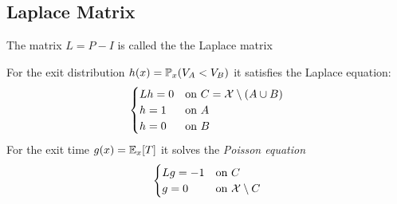 \documentclass[12pt,a4paper]{article}
\begin{document}
\subsection{Laplace Matrix}
\begin{defn}
    The matrix $L = P - I$ is called the the Laplace matrix
\end{defn}
For the exit distribution $h(x) = \P_x(V_A < V_B)$ it satisfies the Laplace equation: 
\begin{align*}
    \begin{cases}
        Lh = 0 & \text{on $C = {\cal X}\setminus (A\cup B)$}\\
        h = 1 & \text{on $A$}\\
        h = 0 & \text{on $B$}
    \end{cases}
\end{align*}
For the exit time $g(x) = \E_x[T]$ it solves the \textit{Poisson equation}
\begin{align*}
    \begin{cases}
        Lg = -1 & \text{on $C$}\\
        g = 0 & \text{on ${\cal X}\setminus C$}
    \end{cases}
\end{align*}
\end{document}
